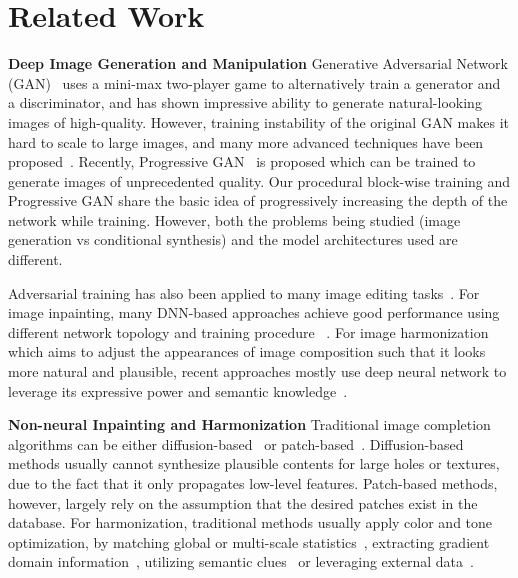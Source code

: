 \section{Related Work}

\noindent\textbf{Deep Image Generation and Manipulation} Generative Adversarial Network (GAN)~\cite{goodfellow2014generative} uses a mini-max two-player game to alternatively train a generator and a discriminator, and has shown impressive ability to generate natural-looking images of high-quality. However, training instability of the original GAN makes it hard to scale to large images, and many more advanced techniques have been proposed~\cite{denton2015deep,radford2015unsupervised,zhao2016energy,arjovsky2017wasserstein,gulrajani2017improved}. Recently, Progressive GAN~\cite{karras2017progressive} is proposed which can be trained to generate images of unprecedented quality. Our procedural block-wise training and Progressive GAN share the basic idea of progressively increasing the depth of the network while training. However, both the problems being studied (image generation vs conditional synthesis) and the model architectures used are different. 

Adversarial training has also been applied to many image editing tasks~\cite{kim2016accurate,dong2014learning,ledig2016photo,isola2016image,zhu2017unpaired}. For image inpainting, many DNN-based approaches achieve good performance using different network topology and training procedure ~\cite{pathak2016context,yang2017high,yeh2016semantic,iizuka2017globally}. For image harmonization which aims to adjust the appearances of image composition such that it looks more natural and plausible, recent approaches mostly use deep neural network to leverage its expressive power and semantic knowledge~\cite{zhu2015learning,tsai2017deep}.

\noindent\textbf{Non-neural Inpainting and Harmonization} Traditional image completion algorithms can be either diffusion-based~\cite{bertalmio2000image,elad2005simultaneous} or patch-based~\cite{bertalmio2003simultaneous,barnes2009patchmatch}. Diffusion-based methods usually cannot synthesize plausible contents for large holes or textures, due to the fact that it only propagates low-level features. Patch-based methods, however, largely rely on the assumption that the desired patches exist in the database. For harmonization, traditional methods usually apply color and tone optimization, by matching global or multi-scale statistics~\cite{reinhard2001color,sunkavalli2010multi}, extracting gradient domain information~\cite{perez2003poisson,tao2010error}, utilizing semantic clues~\cite{tsai2016sky} or leveraging external data~\cite{johnson2011cg2real}. 
